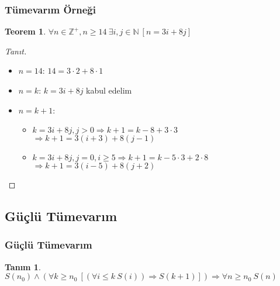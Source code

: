 \documentclass[dvipsnames]{beamer}
\theoremstyle{definition}
\newtheorem{tanim}[theorem]{Tanım}
\theoremstyle{example}
\theoremstyle{plain}
\newtheorem{teorem}[theorem]{Teorem}
\begin{document}
\begin{frame}
  \frametitle{Tümevarım Örneği}

  \begin{teorem}
    $\forall n \in \mathbb{Z}^+, n \geq 14~\exists i,j \in \mathbb{N}~[n=3i+8j]$
  \end{teorem}

  \pause
  \begin{proof}[Tanıt]
    \begin{itemize}
      \item $n=14$: $14=3 \cdot 2 + 8 \cdot 1$

      \pause
      \item $n=k$: $k=3i+8j$ kabul edelim

      \pause
      \item $n=k+1$:
      \begin{itemize}
        \item $k=3i+8j, j>0 \Rightarrow k+1=k-8+3 \cdot 3$\\
          $\Rightarrow k+1=3(i+3)+8(j-1)$
        \item $k=3i+8j, j=0, i \geq 5 \Rightarrow k+1=k-5 \cdot 3+2 \cdot 8$\\
          $\Rightarrow k+1=3(i-5)+8(j+2)$
      \end{itemize}
    \end{itemize}
  \end{proof}
\end{frame}

\subsection{Güçlü Tümevarım}

\begin{frame}
  \frametitle{Güçlü Tümevarım}

  \begin{tanim}
    $S(n_0) \wedge
      (\forall k \geq n_0~[(\forall i \leq k~S(i)) \Rightarrow S(k+1)])
      \Rightarrow \forall n \geq n_0~S(n)$
  \end{tanim}
\end{frame}
\end{document}
